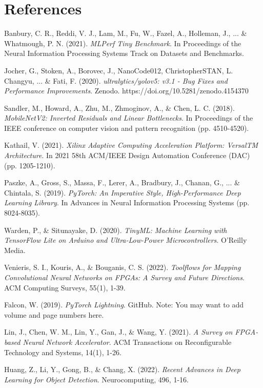 \documentclass{article}
\begin{document}
\section{References}
\begin{thebibliography}{99}

Banbury, C. R., Reddi, V. J., Lam, M., Fu, W., Fazel, A., Holleman, J., ... \& Whatmough, P. N. (2021).
\textit{MLPerf Tiny Benchmark}.
In Proceedings of the Neural Information Processing Systems Track on Datasets and Benchmarks.

Jocher, G., Stoken, A., Borovec, J., NanoCode012, ChristopherSTAN, L. Changyu, ... \& Fati, F. (2020).
\textit{ultralytics/yolov5: v3.1 - Bug Fixes and Performance Improvements}.
Zenodo. https://doi.org/10.5281/zenodo.4154370

Sandler, M., Howard, A., Zhu, M., Zhmoginov, A., \& Chen, L. C. (2018).
\textit{MobileNetV2: Inverted Residuals and Linear Bottlenecks}.
In Proceedings of the IEEE conference on computer vision and pattern recognition (pp. 4510-4520).

Kathail, V. (2021).
\textit{Xilinx Adaptive Computing Acceleration Platform: VersalTM Architecture}.
In 2021 58th ACM/IEEE Design Automation Conference (DAC) (pp. 1205-1210).

Paszke, A., Gross, S., Massa, F., Lerer, A., Bradbury, J., Chanan, G., ... \& Chintala, S. (2019).
\textit{PyTorch: An Imperative Style, High-Performance Deep Learning Library}.
In Advances in Neural Information Processing Systems (pp. 8024-8035).

Warden, P., \& Situnayake, D. (2020).
\textit{TinyML: Machine Learning with TensorFlow Lite on Arduino and Ultra-Low-Power Microcontrollers}.
O'Reilly Media.

Venieris, S. I., Kouris, A., \& Bouganis, C. S. (2022).
\textit{Toolflows for Mapping Convolutional Neural Networks on FPGAs: A Survey and Future Directions}.
ACM Computing Surveys, 55(1), 1-39.

Falcon, W. (2019).
\textit{PyTorch Lightning}.
GitHub. Note: You may want to add volume and page numbers here.

Lin, J., Chen, W. M., Lin, Y., Gan, J., \& Wang, Y. (2021).
\textit{A Survey on FPGA-based Neural Network Accelerator}.
ACM Transactions on Reconfigurable Technology and Systems, 14(1), 1-26.

Huang, Z., Li, Y., Gong, B., \& Chang, X. (2022).
\textit{Recent Advances in Deep Learning for Object Detection}.
Neurocomputing, 496, 1-16.

\end{thebibliography}
\end{document}
